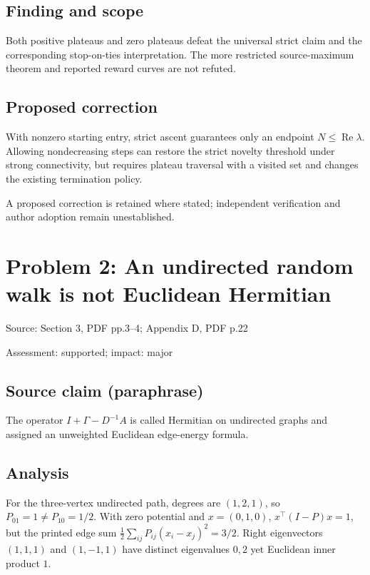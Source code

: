 \documentclass[11pt]{article}
\begin{document}
\subsection*{Finding and scope}

Both positive plateaus and zero plateaus defeat the universal strict claim and the corresponding stop-on-ties interpretation. The more restricted source-maximum theorem and reported reward curves are not refuted.

\subsection*{Proposed correction}

With nonzero starting entry, strict ascent guarantees only an endpoint \(N\le\operatorname{Re}\lambda\). Allowing nondecreasing steps can restore the strict novelty threshold under strong connectivity, but requires plateau traversal with a visited set and changes the existing termination policy.

A proposed correction is retained where stated; independent verification and author adoption remain unestablished.

\section*{Problem 2: An undirected random walk is not Euclidean Hermitian}

Source: Section 3, PDF pp.3–4; Appendix D, PDF p.22

Assessment: supported; impact: major

\subsection*{Source claim (paraphrase)}

The operator \(I+\Gamma-D^{-1}A\) is called Hermitian on undirected graphs and assigned an unweighted Euclidean edge-energy formula.

\subsection*{Analysis}

For the three-vertex undirected path, degrees are \((1,2,1)\), so \(P_{01}=1\ne P_{10}=1/2\). With zero potential and \(x=(0,1,0)\), \(x^\top(I-P)x=1\), but the printed edge sum \(\tfrac12\sum_{ij}P_{ij}(x_i-x_j)^2=3/2\). Right eigenvectors \((1,1,1)\) and \((1,-1,1)\) have distinct eigenvalues \(0,2\) yet Euclidean inner product \(1\).
\end{document}
